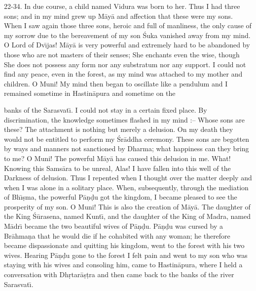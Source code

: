 22-34. In due course, a child named Vidura was born to her. Thus I had three sons; and in my mind grew up M\=ay\=a and affection that these were my sons. When I saw again those three sons, heroic and full of manliness, the only cause of my sorrow due to the bereavement of my son \'Suka vanished away from my mind. O Lord of Dv\={\i}jas! M\=ay\=a is very powerful and extremely hard to be abandoned by those who are not masters of their senses; She enchants even the wise, though She does not possess any form nor any substratum nor any support. I could not find any peace, even in the forest, as my mind was attached to my mother and children. O Muni! My mind then began to oscillate like a pendulum and I remained sometime in Hastin\=apura and sometime on the

banks of the Sarasvat\={\i}. I could not stay in a certain fixed place. By discrimination, the knowledge sometimes flashed in my mind :-- Whose sons are these? The attachment is nothing but merely a delusion. On my death they would not be entitled to perform my \'Sr\=addha ceremony. These sons are begotten by ways and manners not sanctioned by Dharma; what happiness can they bring to me? O Muni! The powerful M\=ay\=a has caused this delusion in me. What! Knowing this Sams\=ara to be unreal, Alas! I have fallen into this well of the Darkness of delusion. Thus I repented when I thought over the matter deeply and when I was alone in a solitary place. When, subsequently, through the mediation of Bh\={\i}\d{s}ma, the powerful P\=a\d{n}\d{d}u got the kingdom, I became pleased to see the prosperity of my son. O Muni! This is also the creation of M\=ay\=a. The daughter of the King \'S\=urasena, named Kunt\={\i}, and the daughter of the King of Madra, named M\=adr\={\i} became the two beautiful wives of P\=a\d{n}\d{d}u. P\=a\d{n}\d{d}u was cursed by a Br\=ahma\d{n}a that he would die if he cohabited with any woman; he therefore became dispassionate and quitting his kingdom, went to the forest with his two wives. Hearing P\=a\d{n}\d{d}u gone to the forest I felt pain and went to my son who was staying with his wives and consoling him, came to Hastin\=apura, where I held a conversation with Dh\d{r}tar\=a\d{s}\d{t}ra and then came back to the banks of the river Sarasvat\={\i}.

